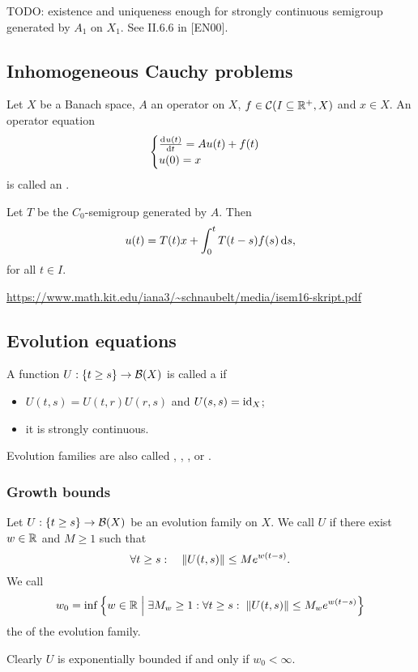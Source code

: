 TODO: existence and uniqueness enough for strongly continuous semigroup generated by $A_1$ on $X_1$. See II.6.6 in [EN00].

\subsection{Inhomogeneous Cauchy problems}
\begin{definition}
Let $X$ be a Banach space, $A$ an operator on $X$, $f\in \operatorname{\mathcal{C}}(I\subseteq \mathbb{R}^+, X)$ and $x\in X$. An operator equation
\[ \begin{cases}
\od{u(t)}{t} = Au(t) + f(t) \\ u(0) = x
\end{cases} \]
is called an .
\end{definition}

\begin{theorem}
Let $T$ be the $C_0$-semigroup generated by $A$. Then
\[ u(t) = T(t)x + \int_0^t T(t-s)f(s)\operatorname{d \!}{s}, \]
for all $t\in I$.
\end{theorem}

\url{https://www.math.kit.edu/iana3/~schnaubelt/media/isem16-skript.pdf}

\subsection{Evolution equations}
\begin{definition}
A function $U: \{t\geq s\}\to \operatorname{\mathcal{B}}(X)$ is called a  if
\begin{itemize}
\item $U(t,s) = U(t,r)U(r,s)$ and $U(s,s) = \operatorname{id}_X$;
\item it is strongly continuous.
\end{itemize}
Evolution families are also called , ,
,  or .
\end{definition}

\subsubsection{Growth bounds}
\begin{definition}
Let $U: \{t\geq s\}\to \operatorname{\mathcal{B}}(X)$ be an evolution family on $X$. We call $U$  if there exist $w\in\mathbb{R}$ and $M\geq 1$ such that
\[ \forall t\geq s:\quad \lVert U(t,s)\rVert \leq M e^{w(t-s)}. \]
We call
\[ w_0 = \inf\setbuilder{w\in \R}{\exists M_w \geq 1: \forall t\geq s:\; \norm{U(t,s)} \leq M_w e^{w(t-s)} } \]
the  of the evolution family.
\end{definition}
Clearly $U$ is exponentially bounded if and only if $w_0 < \infty$.

